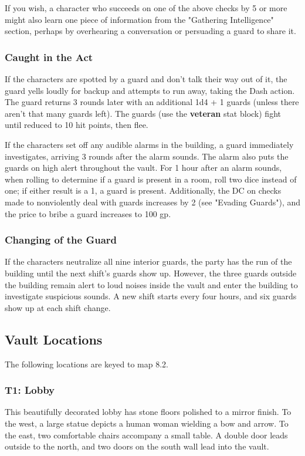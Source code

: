 \documentclass[10pt,a4paper,twoside,bg=print,twocolumn,openany,nodeprecatedcode]{dndbook}
\begin{document}
If you wish, a character who succeeds on one of the above checks by 5 or more might also learn one piece of information from the "Gathering Intelligence" section, perhaps by overhearing a conversation or persuading a guard to share it.

\subsubsection{Caught in the Act}
If the characters are spotted by a guard and don't talk their way out of it, the guard yells loudly for backup and attempts to run away, taking the Dash action. The guard returns 3 rounds later with an additional 1d4 + 1 guards (unless there aren't that many guards left). The guards (use the \textbf{veteran} stat block) fight until reduced to 10 hit points, then flee.

If the characters set off any audible alarms in the building, a guard immediately investigates, arriving 3 rounds after the alarm sounds. The alarm also puts the guards on high alert throughout the vault. For 1 hour after an alarm sounds, when rolling to determine if a guard is present in a room, roll two dice instead of one; if either result is a 1, a guard is present. Additionally, the DC on checks made to nonviolently deal with guards increases by 2 (see "Evading Guards"), and the price to bribe a guard increases to 100 gp.

\subsubsection{Changing of the Guard}
If the characters neutralize all nine interior guards, the party has the run of the building until the next shift's guards show up. However, the three guards outside the building remain alert to loud noises inside the vault and enter the building to investigate suspicious sounds. A new shift starts every four hours, and six guards show up at each shift change.

\subsection{Vault Locations}
The following locations are keyed to map 8.2.

\subsubsection{T1: Lobby}
\begin{DndReadAloud}{}
This beautifully decorated lobby has stone floors polished to a mirror finish. To the west, a large statue depicts a human woman wielding a bow and arrow. To the east, two comfortable chairs accompany a small table. A double door leads outside to the north, and two doors on the south wall lead into the vault.

\end{DndReadAloud}
\end{document}
